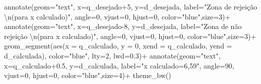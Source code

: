 \documentclass[
]{book}
\newenvironment{Shaded}{\begin{snugshade}}{\end{snugshade}}
\newcommand{\AttributeTok}[1]{\textcolor[rgb]{0.77,0.63,0.00}{#1}}
\newcommand{\DecValTok}[1]{\textcolor[rgb]{0.00,0.00,0.81}{#1}}
\newcommand{\FloatTok}[1]{\textcolor[rgb]{0.00,0.00,0.81}{#1}}
\newcommand{\FunctionTok}[1]{\textcolor[rgb]{0.00,0.00,0.00}{#1}}
\newcommand{\NormalTok}[1]{#1}
\newcommand{\SpecialCharTok}[1]{\textcolor[rgb]{0.00,0.00,0.00}{#1}}
\newcommand{\StringTok}[1]{\textcolor[rgb]{0.31,0.60,0.02}{#1}}
\begin{document}
\begin{Shaded}
\begin{Highlighting}[]
 \FunctionTok{annotate}\NormalTok{(}\AttributeTok{geom=}\StringTok{"text"}\NormalTok{, }\AttributeTok{x=}\NormalTok{q\_desejado}\SpecialCharTok{+}\DecValTok{5}\NormalTok{, }\AttributeTok{y=}\NormalTok{d\_desejada, }\AttributeTok{label=}\StringTok{"Zona de rejeição }\SpecialCharTok{\textbackslash{}n}\StringTok{(para x calculado)"}\NormalTok{, }\AttributeTok{angle=}\DecValTok{0}\NormalTok{, }\AttributeTok{vjust=}\DecValTok{0}\NormalTok{, }\AttributeTok{hjust=}\DecValTok{0}\NormalTok{, }\AttributeTok{color=}\StringTok{"blue"}\NormalTok{,}\AttributeTok{size=}\DecValTok{3}\NormalTok{)}\SpecialCharTok{+}
  \FunctionTok{annotate}\NormalTok{(}\AttributeTok{geom=}\StringTok{"text"}\NormalTok{, }\AttributeTok{x=}\NormalTok{q\_desejado}\DecValTok{{-}8}\NormalTok{, }\AttributeTok{y=}\NormalTok{d\_desejada, }\AttributeTok{label=}\StringTok{"Zona de não rejeição  }\SpecialCharTok{\textbackslash{}n}\StringTok{(para x calculado)"}\NormalTok{, }\AttributeTok{angle=}\DecValTok{0}\NormalTok{, }\AttributeTok{vjust=}\DecValTok{0}\NormalTok{, }\AttributeTok{hjust=}\DecValTok{0}\NormalTok{, }\AttributeTok{color=}\StringTok{"blue"}\NormalTok{,}\AttributeTok{size=}\DecValTok{3}\NormalTok{)}\SpecialCharTok{+}
   \FunctionTok{geom\_segment}\NormalTok{(}\FunctionTok{aes}\NormalTok{(}\AttributeTok{x =}\NormalTok{ q\_calculado, }\AttributeTok{y =} \DecValTok{0}\NormalTok{, }\AttributeTok{xend =}\NormalTok{ q\_calculado, }\AttributeTok{yend =}\NormalTok{ d\_calculada), }\AttributeTok{color=}\StringTok{"blue"}\NormalTok{, }\AttributeTok{lty=}\DecValTok{2}\NormalTok{, }\AttributeTok{lwd=}\FloatTok{0.3}\NormalTok{)}\SpecialCharTok{+}
  \FunctionTok{annotate}\NormalTok{(}\AttributeTok{geom=}\StringTok{"text"}\NormalTok{, }\AttributeTok{x=}\NormalTok{q\_calculado}\FloatTok{+0.5}\NormalTok{, }\AttributeTok{y=}\NormalTok{d\_calculada, }\AttributeTok{label=}\StringTok{"x calculado=6,59"}\NormalTok{, }\AttributeTok{angle=}\DecValTok{90}\NormalTok{, }\AttributeTok{vjust=}\DecValTok{0}\NormalTok{, }\AttributeTok{hjust=}\DecValTok{0}\NormalTok{, }\AttributeTok{color=}\StringTok{"blue"}\NormalTok{,}\AttributeTok{size=}\DecValTok{4}\NormalTok{)}\SpecialCharTok{+}
  \FunctionTok{theme\_bw}\NormalTok{()}
\end{Highlighting}
\end{Shaded}
\end{document}
